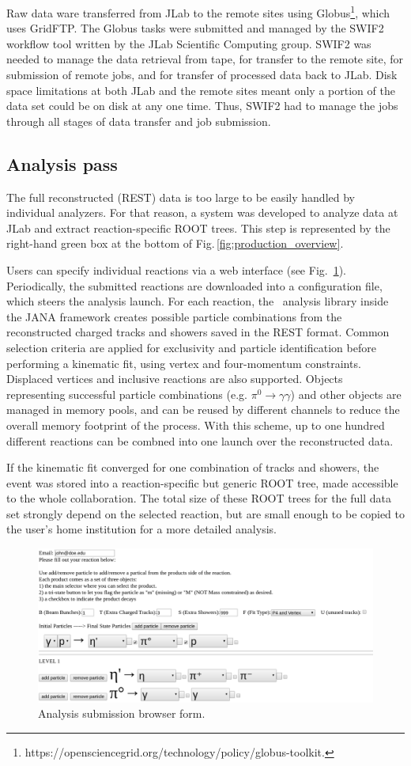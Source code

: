 Raw data ware transferred from JLab to the remote sites using Globus\footnote{https://opensciencegrid.org/technology/policy/globus-toolkit.},  which uses GridFTP. The Globus tasks were submitted and managed by the SWIF2 workflow tool written by the JLab Scientific Computing group. SWIF2 was needed to manage the data retrieval from tape, for transfer to the remote site, for submission of remote jobs, and for transfer of processed data back to JLab. Disk space limitations at both JLab and the remote sites meant only a portion of the data set could be on disk at any one time. Thus, SWIF2 had to manage the jobs through all stages of data transfer and job submission.

\subsection{Analysis pass \label{sec:recanalysis}}

The full reconstructed (REST) data is too large to be easily handled by individual analyzers. For that reason, a system was developed to analyze data at JLab and extract reaction-specific ROOT trees. This step is represented by the right-hand green box at the bottom of Fig.\,\ref{fig:production_overview}.

Users can specify individual reactions via a web interface (see Fig.~\ref{fig:production_analysis}). Periodically, the submitted reactions are downloaded into a configuration file, which steers the analysis launch. For each reaction, the \GX~analysis library inside the JANA framework creates possible particle combinations from the reconstructed charged tracks and showers saved in the REST format. Common selection criteria are applied for exclusivity and particle identification before performing a kinematic fit, using vertex and four-momentum constraints. Displaced vertices and inclusive reactions are also supported. Objects representing successful particle combinations (e.g. $\pi^0 \rightarrow \gamma\gamma$) and other objects are managed in memory pools, and can be reused by different channels to reduce the overall memory footprint of the process. With this scheme, up to one hundred different reactions can be combned into one launch over the reconstructed data.

If the kinematic fit converged for one combination of tracks and showers, the event was stored into a reaction-specific but generic ROOT tree, made accessible to the whole collaboration. The total size of these ROOT trees for the full data set strongly depend on the selected reaction, but are small enough to be copied to the user's home institution for a more detailed analysis.

\begin{figure}[h!]\centering
\includegraphics[width=\textwidth]{figures/analysis_submit_form.png}
\caption[]{\label{fig:production_analysis}Analysis submission browser form.} 
\end{figure}